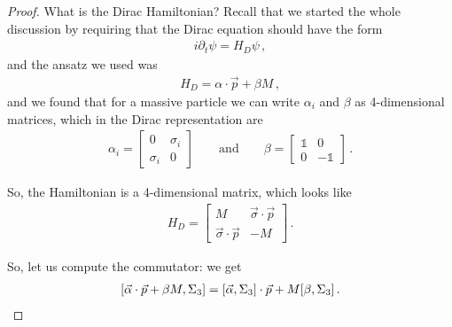 \documentclass[main.tex]{subfiles}
\begin{document}
\begin{proof}
What is the Dirac Hamiltonian? 
Recall that we started the whole discussion by requiring that the Dirac equation should have the form 
%
\begin{align}
i \partial_{t} \psi = H_D \psi 
\,,
\end{align}
%
and the ansatz we used was 
%
\begin{align}
H_D = \alpha \cdot \vec{p} + \beta M
\,,
\end{align}
%
and we found that for a massive particle we can write \(\alpha_{i}\) and \(\beta \) as 4-dimensional matrices, which in the Dirac representation are 
%
\begin{subequations}
\begin{align}
\alpha_{i} = \left[\begin{array}{cc}
0 & \sigma_{i} \\ 
\sigma_{i} & 0
\end{array}\right]
\qquad \text{and} \qquad
\beta = \left[\begin{array}{cc}
\mathbb{1} & 0 \\ 
0 & -\mathbb{1}
\end{array}\right]
\,.
\end{align}
\end{subequations}

So, the Hamiltonian is a 4-dimensional matrix, which looks like 
%
\begin{subequations}
\begin{align}
H_D = \left[\begin{array}{cc}
M & \vec{\sigma} \cdot \vec{p}\\ 
 \vec{\sigma} \cdot \vec{p} & -M
\end{array}\right]
\,.
\end{align}
\end{subequations}

So, let us compute the commutator: we get 
%
\begin{align}
\qty[\vec{\alpha} \cdot \vec{p} + \beta M, \Sigma_3 ]
= \qty[\vec{\alpha}, \Sigma_{3}] \cdot \vec{p} + M \qty[\beta, \Sigma_3 ]
\,.
\end{align}


\end{proof}
\end{document}
